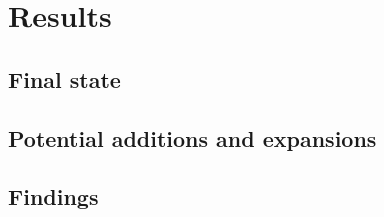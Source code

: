 \chapter{Results}
\label{cha:results}

	\section{Final state}
	
	
	\section{Potential additions and expansions}
	
	\section{Findings}